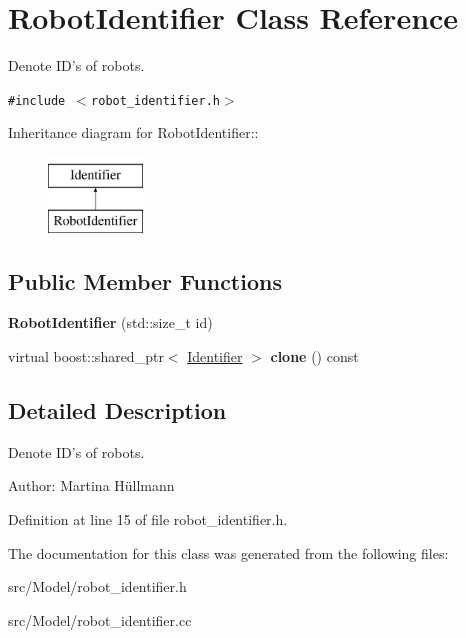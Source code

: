 \hypertarget{class_robot_identifier}{
\section{RobotIdentifier Class Reference}
\label{class_robot_identifier}
}
Denote ID's of robots.  


{\tt \#include $<$robot\_\-identifier.h$>$}

Inheritance diagram for RobotIdentifier::\begin{figure}[H]
\begin{center}
\leavevmode
\includegraphics[height=2cm]{class_robot_identifier}
\end{center}
\end{figure}
\subsection*{Public Member Functions}
\begin{CompactItemize}
\item 
\hypertarget{class_robot_identifier_06b6379fa91d4d7ae0b74ff734c0bd69}{
\textbf{RobotIdentifier} (std::size\_\-t id)}
\label{class_robot_identifier_06b6379fa91d4d7ae0b74ff734c0bd69}

\item 
\hypertarget{class_robot_identifier_940b1d28c51fe39e360c34ebaac9a7ad}{
virtual boost::shared\_\-ptr$<$ \hyperlink{class_identifier}{Identifier} $>$ \textbf{clone} () const }
\label{class_robot_identifier_940b1d28c51fe39e360c34ebaac9a7ad}

\end{CompactItemize}


\subsection{Detailed Description}
Denote ID's of robots. 

\begin{Desc}
\item[Author:]Martina Hüllmann \end{Desc}


Definition at line 15 of file robot\_\-identifier.h.

The documentation for this class was generated from the following files:\begin{CompactItemize}
\item 
src/Model/robot\_\-identifier.h\item 
src/Model/robot\_\-identifier.cc\end{CompactItemize}

